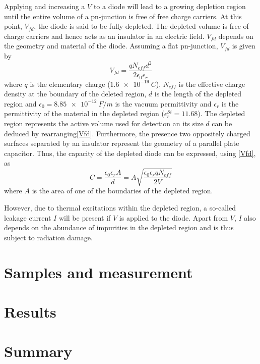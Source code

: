 \documentclass[11pt]{article}
\begin{document}
Applying and increasing a $V$ to a diode will lead to a growing depletion region until the entire volume of a pn-junction is free of free charge carriers. At this point, $V_{fd}$, the diode is said to be fully depleted.
The depleted volume is free of charge carriers and hence acts as an insulator in an electric field. $V_{fd}$ depends on the geometry and material of the diode. Assuming a flat pn-junction, $V_{fd}$ is given by
\begin{equation}
  \label{Vfd}
  V_{fd} = \frac{qN_{eff}d^2}{2\epsilon_0\epsilon_r}
\end{equation}
where $q$ is the elementary charge ($\SI{1.6e-19}{C}$), $N_{eff}$ is the effective charge density at the boundary of the deleted region, $d$ is the length of the depleted region and $\epsilon_0 = \SI{8.85e-12}{F/m}$ is the vacuum permittivity and $\epsilon_r$ is the permittivity of the material in the depleted region ($\epsilon_r^{Si} = 11.68$).
The depleted region represents the active volume used for detection an its size $d$ can be deduced by rearranging\eqref{Vfd}. 
Furthermore, the presence two oppositely charged surfaces separated by an insulator represent the geometry of a parallel plate capacitor. Thus, the capacity of the depleted diode can be expressed, using \eqref{Vfd}, as
\begin{equation}
  \label{C}
  C = \frac{\epsilon_{0}\epsilon_{r}A}{d} = A \sqrt{\frac{\epsilon_0\epsilon_rqN_{eff}}{2V}}
\end{equation}
where $A$ is the area of one of the boundaries of the depleted region.

However, due to thermal excitations within the depleted region, a so-called leakage current $I$ will be present if $V$ is applied to the diode. Apart from $V$, $I$ also depends on the abundance of impurities in the depleted region and is thus subject to radiation damage. 

\section{Samples and measurement}
\label{sec:samples}

\section{Results}
\label{sec:results}

\section{Summary}
\label{sec:summary}



\printbibliography
\end{document}
